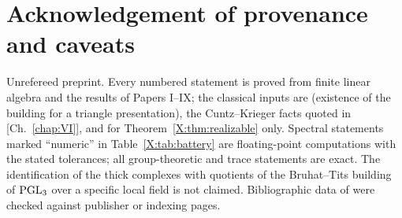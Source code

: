 \section*{Acknowledgement of provenance and caveats}

Unrefereed preprint. Every numbered statement is proved from finite linear algebra and the
results of Papers I--IX; the classical inputs are \cite{CMSZ} (existence of the building for
a triangle presentation), the Cuntz--Krieger facts quoted in [Ch.~\ref{chap:VI}], and \cite{KOR} for
Theorem~\ref{X:thm:realizable} only. Spectral statements marked ``numeric'' in
Table~\ref{X:tab:battery} are floating-point computations with the stated tolerances; all
group-theoretic and trace statements are exact. The identification of the thick complexes
with quotients of the Bruhat--Tits building of $\mathrm{PGL}_3$ over a specific local field is not
claimed. Bibliographic data of \cite{CMSZ,KL,KOR,DKM} were checked against publisher or
indexing pages.

